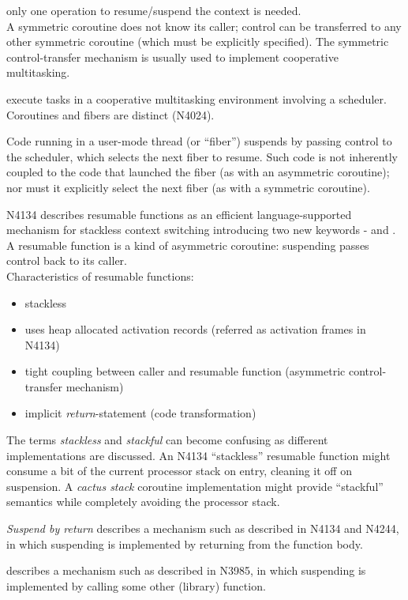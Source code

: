 only one operation to resume/suspend the context is needed.\\
A symmetric coroutine does not know its caller; control can
be transferred to any other symmetric coroutine (which must be explicitly specified).
The symmetric control-transfer mechanism is usually used to implement
cooperative multitasking.

execute tasks in a cooperative multitasking environment involving a scheduler.
Coroutines and fibers are distinct (N4024\cite{N4024}).

Code running in a user-mode thread (or ``fiber'') suspends by passing control
to the scheduler, which selects the next fiber to resume. Such code is not
inherently coupled to the code that launched the fiber (as with an asymmetric
coroutine); nor must it explicitly select the next fiber (as with a symmetric
coroutine).

N4134\cite{N4134} describes resumable functions as an efficient
language-supported mechanism for stackless context switching introducing two
new keywords - \await and \yield. A resumable function is a kind of asymmetric
coroutine: suspending passes control back to its caller.\\
Characteristics of resumable functions:
\begin{itemize}
    \item stackless
    \item uses heap allocated activation records (referred as activation frames
          in N4134)
    \item tight coupling between caller and resumable function (asymmetric
          control-transfer mechanism)
    \item implicit \emph{return}-statement\cite{N4134} (code transformation)
\end{itemize}

The terms \emph{stackless} and \emph{stackful} can become confusing as
different implementations are discussed. An N4134\cite{N4134} ``stackless''
resumable function might consume a bit of the current processor stack on
entry, cleaning it off on suspension. A \emph{cactus stack} coroutine
implementation might provide ``stackful'' semantics while completely avoiding
the processor stack.

\emph{Suspend by return} describes a mechanism such as described in N4134\cite{N4134} and
N4244\cite{N4244}, in which suspending is implemented by returning from the
function body.

describes a mechanism such as described in N3985\cite{N3985}, in which
suspending is implemented by calling some other (library) function.
